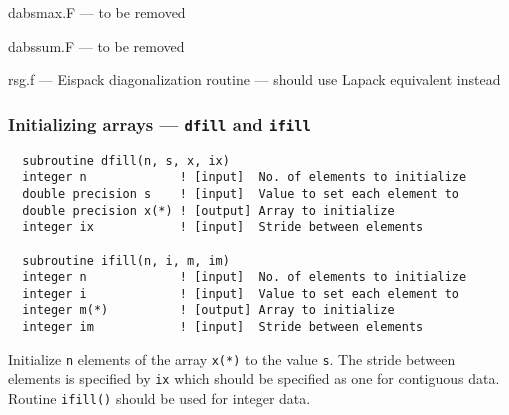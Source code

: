dabsmax.F --- to be removed

dabssum.F --- to be removed

rsg.f --- Eispack diagonalization routine --- should use Lapack
equivalent instead


\subsubsection{Initializing arrays --- {\tt dfill} and {\tt ifill}}

\begin{verbatim}
  subroutine dfill(n, s, x, ix)
  integer n             ! [input]  No. of elements to initialize
  double precision s    ! [input]  Value to set each element to
  double precision x(*) ! [output] Array to initialize
  integer ix            ! [input]  Stride between elements

  subroutine ifill(n, i, m, im)
  integer n             ! [input]  No. of elements to initialize
  integer i             ! [input]  Value to set each element to
  integer m(*)          ! [output] Array to initialize
  integer im            ! [input]  Stride between elements
\end{verbatim}

Initialize \verb+n+ elements of the array \verb+x(*)+ to the value
\verb+s+.  The stride between elements is specified by \verb+ix+ which
should be specified as one for contiguous data.  Routine
\verb+ifill()+ should be used for integer data.


